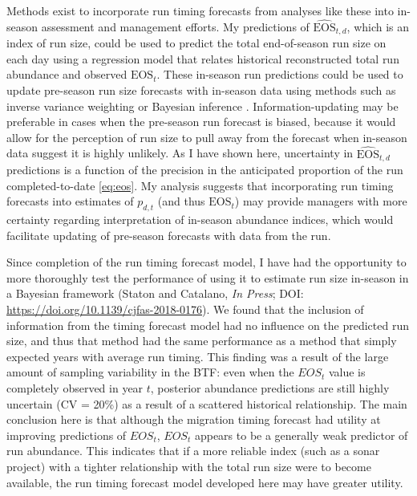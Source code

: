 \documentclass[12pt,]{book}
\theoremstyle{definition}
\theoremstyle{definition}
\theoremstyle{definition}
\theoremstyle{remark}
\begin{document}
Methods exist to incorporate run timing forecasts from analyses like
these into in-season assessment and management efforts. My predictions
of \(\widehat{\text{EOS}}_{t,d}\), which is an index of run size, could
be used to predict the total end-of-season run size on each day using a
regression model that relates historical reconstructed total run
abundance and observed \(\text{EOS}_t\). These in-season run predictions
could be used to update pre-season run size forecasts with in-season
data using methods such as inverse variance weighting
\citep[e.g.,][]{walters-buckingham-1975} or Bayesian inference
\citep[e.g.,][]{fried-hilborn-1988}. Information-updating may be
preferable in cases when the pre-season run forecast is biased, because
it would allow for the perception of run size to pull away from the
forecast when in-season data suggest it is highly unlikely. As I have
shown here, uncertainty in \(\widehat{\text{EOS}}_{t,d}\) predictions is
a function of the precision in the anticipated proportion of the run
completed-to-date \eqref{eq:eos}. My analysis suggests that incorporating
run timing forecasts into estimates of \(p_{d,t}\) (and thus
\(\text{EOS}_t\)) may provide managers with more certainty regarding
interpretation of in-season abundance indices, which would facilitate
updating of pre-season forecasts with data from the run.

Since completion of the run timing forecast model, I have had the
opportunity to more thoroughly test the performance of using it to
estimate run size in-season in a Bayesian framework (Staton and
Catalano, \textit{In Press}; DOI:
\url{https://doi.org/10.1139/cjfas-2018-0176}). We found that the
inclusion of information from the timing forecast model had no influence
on the predicted run size, and thus that method had the same performance
as a method that simply expected years with average run timing. This
finding was a result of the large amount of sampling variability in the
BTF: even when the \(EOS_{t}\) value is completely observed in year
\(t\), posterior abundance predictions are still highly uncertain (CV =
20\%) as a result of a scattered historical relationship. The main
conclusion here is that although the migration timing forecast had
utility at improving predictions of \(EOS_t\), \(EOS_t\) appears to be a
generally weak predictor of run abundance. This indicates that if a more
reliable index (such as a sonar project) with a tighter relationship
with the total run size were to become available, the run timing
forecast model developed here may have greater utility.
\end{document}
